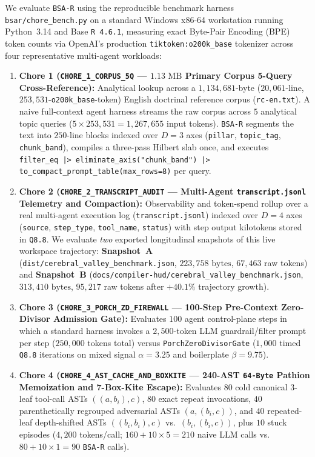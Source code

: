 \documentclass[11pt]{article}
\theoremstyle{plain}
\theoremstyle{definition}
\begin{document}
We evaluate \texttt{BSA-R} using the reproducible benchmark harness \texttt{bsar/chore\_bench.py} on a standard Windows x86-64 workstation running Python~3.14 and Base \texttt{R 4.6.1}, measuring exact Byte-Pair Encoding (BPE) token counts via OpenAI's production \texttt{tiktoken:o200k\_base} tokenizer across four representative multi-agent workloads:
\begin{enumerate}
  \item \textbf{Chore 1 (\texttt{CHORE\_1\_CORPUS\_5Q} --- $1.13\text{ MB}$ Primary Corpus 5-Query Cross-Reference):} Analytical lookup across a $1{,}134{,}681$-byte ($20{,}061$-line, $253{,}531$-\texttt{o200k\_base}-token) English doctrinal reference corpus (\texttt{rc-en.txt}). A naive full-context agent harness streams the raw corpus across $5$ analytical topic queries ($5 \times 253{,}531 = 1{,}267{,}655$ input tokens). \texttt{BSA-R} segments the text into $250$-line blocks indexed over $D = 3$ axes (\texttt{pillar}, \texttt{topic\_tag}, \texttt{chunk\_band}), compiles a three-pass Hilbert slab once, and executes \texttt{filter\_eq |> eliminate\_axis("chunk\_band") |> to\_compact\_prompt\_table(max\_rows=8)} per query.
  \item \textbf{Chore 2 (\texttt{CHORE\_2\_TRANSCRIPT\_AUDIT} --- Multi-Agent \texttt{transcript.jsonl} Telemetry and Compaction):} Observability and token-spend rollup over a real multi-agent execution log (\texttt{transcript.jsonl}) indexed over $D = 4$ axes (\texttt{source}, \texttt{step\_type}, \texttt{tool\_name}, \texttt{status}) with step output kilotokens stored in \texttt{Q8.8}. We evaluate \emph{two} exported longitudinal snapshots of this live workspace trajectory: \textbf{Snapshot~A} (\texttt{dist/cerebral\_valley\_benchmark.json}, $223{,}758\text{ bytes}$, $67{,}463$ raw tokens) and \textbf{Snapshot~B} (\texttt{docs/compiler-hud/cerebral\_valley\_benchmark.json}, $313{,}410\text{ bytes}$, $95{,}217$ raw tokens after $+40.1\%$ trajectory growth).
  \item \textbf{Chore 3 (\texttt{CHORE\_3\_PORCH\_ZD\_FIREWALL} --- 100-Step Pre-Context Zero-Divisor Admission Gate):} Evaluates $100$ agent control-plane steps in which a standard harness invokes a $2{,}500$-token LLM guardrail/filter prompt per step ($250{,}000$ tokens total) versus \texttt{PorchZeroDivisorGate} ($1{,}000$ timed \texttt{Q8.8} iterations on mixed signal $\alpha = 3.25$ and boilerplate $\beta = 9.75$).
  \item \textbf{Chore 4 (\texttt{CHORE\_4\_AST\_CACHE\_AND\_BOXKITE} --- 240-AST \texttt{64-Byte} Pathion Memoization and 7-Box-Kite Escape):} Evaluates $80$ cold canonical 3-leaf tool-call ASTs $((a, b_i), c)$, $80$ exact repeat invocations, $40$ parenthetically regrouped adversarial ASTs $(a, (b_i, c))$, and $40$ repeated-leaf depth-shifted ASTs $((b_i, b_i), c)$ vs.\ $(b_i, (b_i, c))$, plus $10$ stuck episodes ($4{,}200$ tokens/call; $160 + 10 \times 5 = 210$ naive LLM calls vs.\ $80 + 10 \times 1 = 90$ \texttt{BSA-R} calls).
\end{enumerate}
\end{document}
